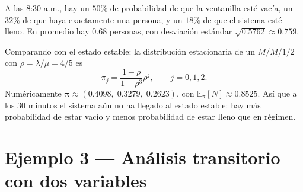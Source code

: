 \documentclass[11pt,a4paper]{article}
\theoremstyle{definition}
\theoremstyle{remark}
\newcommand{\E}{\mathbb{E}}
\begin{document}
\begin{ejemplo}
A las 8:30 a.m., hay un $50\%$ de probabilidad de que la ventanilla esté
vacía, un $32\%$ de que haya exactamente una persona, y un $18\%$ de que
el sistema esté lleno.  En promedio hay $0.68$ personas, con desviación
estándar $\sqrt{0.5762}\approx 0.759$.

Comparando con el estado estable: la distribución estacionaria
de un $M/M/1/2$ con $\rho=\lambda/\mu=4/5$ es
\[
  \pi_j = \frac{1-\rho}{1-\rho^3}\rho^j,
  \qquad j=0,1,2.
\]
Numéricamente $\boldsymbol{\pi}\approx(0.4098,\;0.3279,\;0.2623)$, con
$\E_\pi[N]\approx 0.8525$.  Así que a los 30 minutos el sistema aún no
ha llegado al estado estable: hay más probabilidad de estar vacío y
menos probabilidad de estar lleno que en régimen.
\end{ejemplo}

\section{Ejemplo 3 --- Análisis transitorio con dos variables}
\end{document}

